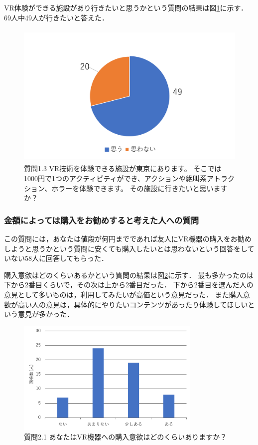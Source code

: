 \documentclass[12pt,a4j]{ltjsarticle}
\begin{document}
VR体験ができる施設があり行きたいと思うかという質問の結果は図\ref{fig:アンケート2_1_3.pdf}に示す．
69人中49人が行きたいと答えた．

\begin{figure}[h]
\begin{center}
 \includegraphics[clip,height=70mm]{
 アンケート2_1_3.pdf}
\end{center}
 \caption{質問1.3 VR技術を体験できる施設が東京にあります。
そこでは1000円で1つのアクティビティができ、アクションや絶叫系アトラクション、ホラーを体験できます。
その施設に行きたいと思いますか？}
 \label{fig:アンケート2_1_3.pdf}
\end{figure}

\subsubsection{金額によっては購入をお勧めすると考えた人への質問}
この質問には，あなたは値段が何円までであれば友人にVR機器の購入をお勧めしようと思うかという質問に安くても購入したいとは思わないという回答をしていない58人に回答してもらった．

購入意欲はどのくらいあるかという質問の結果は図\ref{fig:アンケート2_2_1.pdf}に示す．
最も多かったのは下から2番目くらいで，その次は上から2番目だった．
下から2番目を選んだ人の意見として多いものは，利用してみたいが高価という意見だった．
また購入意欲が高い人の意見は，具体的にやりたいコンテンツがあったり体験してほしいという意見が多かった．

\begin{figure}[h]
\begin{center}
 \includegraphics[clip,height=55mm]{
 アンケート2_2_1.pdf}
\end{center}
 \caption{質問2.1 あなたはVR機器への購入意欲はどのくらいありますか？}
 \label{fig:アンケート2_2_1.pdf}
\end{figure}
\end{document}
